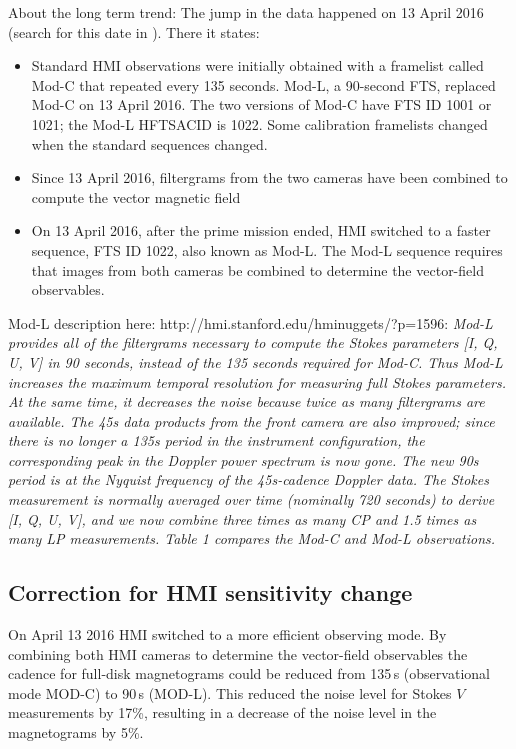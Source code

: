 \documentclass{aa}
\begin{document}
About the long term trend: The jump in the data happened on 13 April 2016 (search for this date in \cite{2018SoPh..293...45H}). There it states:
\begin{itemize}
\item Standard HMI observations were initially obtained with a framelist called Mod-C that
repeated every 135 seconds. Mod-L, a 90-second FTS, replaced Mod-C on 13 April 2016.
The two versions of Mod-C have FTS ID 1001 or 1021; the Mod-L HFTSACID is 1022.
Some calibration framelists changed when the standard sequences changed.
\item Since 13 April
2016, filtergrams from the two cameras have been combined to compute the vector magnetic
field \cite[]{2014SoPh..289.3483H,2016SoPh..291.1887C}
\item On 13 April 2016, after the prime mission ended, HMI switched to
a faster sequence, FTS ID 1022, also known as Mod-L. The Mod-L sequence requires that
images from both cameras be combined to determine the vector-field observables. 
\end{itemize}
Mod-L description here: http://hmi.stanford.edu/hminuggets/?p=1596: \textsl{
Mod-L provides all of the filtergrams necessary to compute the Stokes parameters [I, Q, U, V] in 90 seconds, instead of the 135 seconds required for Mod-C. Thus Mod-L increases the maximum temporal resolution for measuring full Stokes parameters. At the same time, it decreases the noise because twice as many filtergrams are available. The 45s data products from the front camera are also improved; since there is no longer a 135s period in the instrument configuration, the corresponding peak in the Doppler power spectrum is now gone. The new 90s period is at the Nyquist frequency of the 45s-cadence Doppler data. The Stokes measurement is normally averaged over time (nominally 720 seconds) to derive [I, Q, U, V], and we now combine three times as many CP and 1.5 times as many LP measurements. Table 1 compares the Mod-C and Mod-L observations.}

\subsection{Correction for HMI sensitivity change}

On April 13 2016 HMI switched to a more efficient observing mode. By combining both HMI cameras to determine the vector-field observables the cadence for full-disk magnetograms could be reduced from 135\,s (observational mode MOD-C) to 90\,s (MOD-L). This reduced the noise level for Stokes $V$ measurements by 17\%, resulting in a decrease of the noise level in the \los{} magnetograms by 5\%.
\end{document}
